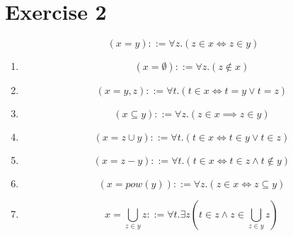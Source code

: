 \documentclass{article}
\begin{document}
\section*{Exercise 2}
\[
  (x = y) ::= \forall z . (z \in x \iff z \in y)
\]
\begin{enumerate}[label=\alph*.]
  \item
        \[
          (x = \emptyset) ::= \forall z . (z \notin x)
        \]
  \item
        \[
          (x = {y,z}) ::= \forall t . (t \in x \iff t = y \lor t = z)
        \]
  \item
        \[
          (x \subseteq y) ::= \forall z . (z \in x \implies z \in y)
        \]
  \item
        \[
          (x = z \cup y) ::= \forall t . (t \in x \iff t \in y \lor t \in z)
        \]
  \item
        \[
          (x = z - y) ::= \forall t . (t \in x \iff t \in z \land t \notin y)
        \]

  \item
        \[
          (x = pow(y)) ::= \forall z . (z \in x \iff z \subseteq y)
        \]
  \item
        \[
          x = \bigcup_{z \in y} z ::= \forall t . \exists z (t \in z \land z \in \bigcup_{z \in y} z)
        \]
\end{enumerate}
\end{document}
